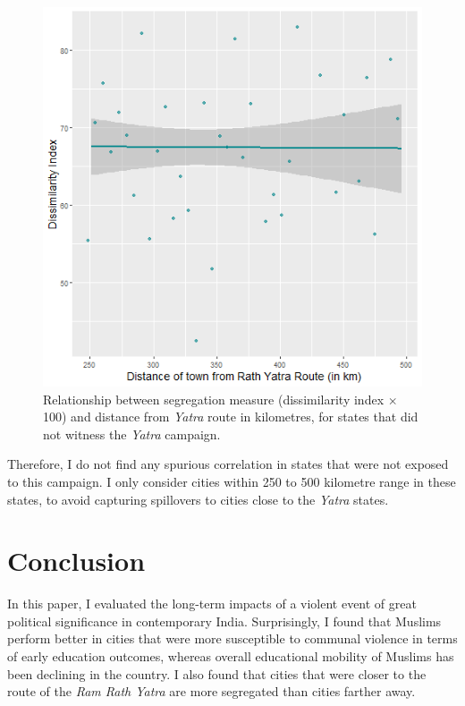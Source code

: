 \documentclass{article}
\begin{document}
\begin{figure}[H]
    \centering
    \includegraphics[scale = 0.6]{images/graph_nonyatra_disindex.png}
    \caption{Relationship between segregation measure (dissimilarity index $\times$ 100) and distance from \textit{Yatra} route in kilometres, for states that did not witness the \textit{Yatra} campaign.}
    \label{fig:nonyatra_disindex}
\end{figure}

Therefore, I do not find any spurious correlation in states that were not exposed to this campaign. I only consider cities within 250 to 500 kilometre range in these states, to avoid capturing spillovers to cities close to the \textit{Yatra} states. 

\section{Conclusion}\label{conclusion}
In this paper, I evaluated the long-term impacts of a violent event of great political significance in contemporary India. Surprisingly, I found that Muslims perform better in cities that were more susceptible to communal violence in terms of early education outcomes, whereas overall educational mobility of Muslims has been declining in the country.  I also found that cities that were closer to the route of the \textit{Ram Rath Yatra} are more segregated than cities farther away.
\end{document}
